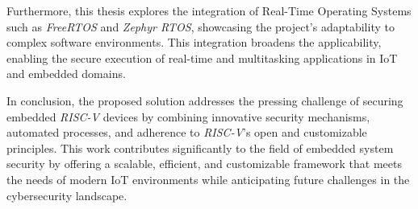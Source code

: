 Furthermore, this thesis explores the integration of Real-Time Operating Systems
such as \textit{FreeRTOS} and \textit{Zephyr RTOS}, showcasing the project's adaptability
to complex software environments. This integration broadens the applicability, enabling
the secure execution of real-time and multitasking applications in IoT and embedded
domains.

In conclusion, the proposed solution addresses the pressing challenge of
securing embedded \textit{RISC-V} devices by combining innovative security mechanisms,
automated processes, and adherence to \textit{RISC-V}'s open and customizable
principles. This work contributes significantly to the field of embedded system security
by offering a scalable, efficient, and customizable framework that meets the needs
of modern IoT environments while anticipating future challenges in the cybersecurity
landscape.

